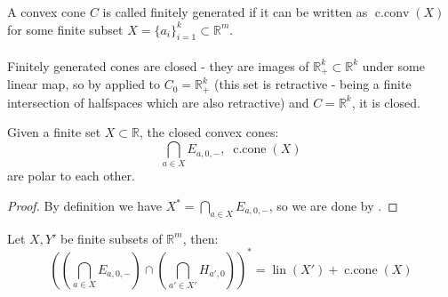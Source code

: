 \begin{defn}\label{defn:017-fg-cones}
	A convex cone $C$ is called finitely generated if it can be written as $\operatorname{c.conv}(X)$ for some finite subset $X=\{a_i\}_{i=1}^k\subset \mathbb{R}^m$.
\end{defn}

\paragraph{}Finitely generated cones are closed - they are images of $\mathbb{R}_+^k\subset \mathbb{R}^k$ under some linear map, so by  applied to $C_0=\mathbb{R}_+^k$ (this set is retractive - being a finite intersection of halfspaces which are also retractive) and $C=\mathbb{R}^k$, it is closed.

\begin{prop}\label{prop:017-farkas}
	Given a finite set $X\subset \mathbb{R}$, the closed convex cones:
	\[
		\bigcap_{a\in X}E_{a,0,-},\;\operatorname{c.cone}(X)
	\]
	are polar to each other.
\end{prop}

\begin{proof}
	By definition we have $X^\ast=\bigcap_{a\in X}E_{a,0,-}$, so we are done by .
\end{proof}

\begin{exmp}
	Let $X,Y'$ be finite subsets of $\mathbb{R}^m$, then:
	\[
		\left(\left(\bigcap_{a\in X}E_{a,0,-}\right)\cap \left(\bigcap_{a'\in X'}H_{a',0}\right)\right)^\ast
		=\operatorname{lin}(X')+\operatorname{c.cone}(X)
	\]
\end{exmp}

